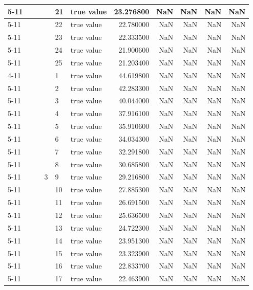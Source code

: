 \begin{tabular}{llllllrrrrr}
\cline{5-11}
 &  &  &  & 21 & true value & 23.276800 & NaN & NaN & NaN & NaN \\
\cline{5-11}
 &  &  &  & 22 & true value & 22.780000 & NaN & NaN & NaN & NaN \\
\cline{5-11}
 &  &  &  & 23 & true value & 22.333500 & NaN & NaN & NaN & NaN \\
\cline{5-11}
 &  &  &  & 24 & true value & 21.900600 & NaN & NaN & NaN & NaN \\
\cline{5-11}
 &  &  &  & 25 & true value & 21.203400 & NaN & NaN & NaN & NaN \\
\cline{4-11} \cline{5-11}
 &  &  & \multirow[t]{25}{*}{3} & 1 & true value & 44.619800 & NaN & NaN & NaN & NaN \\
\cline{5-11}
 &  &  &  & 2 & true value & 42.283300 & NaN & NaN & NaN & NaN \\
\cline{5-11}
 &  &  &  & 3 & true value & 40.044000 & NaN & NaN & NaN & NaN \\
\cline{5-11}
 &  &  &  & 4 & true value & 37.916100 & NaN & NaN & NaN & NaN \\
\cline{5-11}
 &  &  &  & 5 & true value & 35.910600 & NaN & NaN & NaN & NaN \\
\cline{5-11}
 &  &  &  & 6 & true value & 34.034300 & NaN & NaN & NaN & NaN \\
\cline{5-11}
 &  &  &  & 7 & true value & 32.291800 & NaN & NaN & NaN & NaN \\
\cline{5-11}
 &  &  &  & 8 & true value & 30.685800 & NaN & NaN & NaN & NaN \\
\cline{5-11}
 &  &  &  & 9 & true value & 29.216800 & NaN & NaN & NaN & NaN \\
\cline{5-11}
 &  &  &  & 10 & true value & 27.885300 & NaN & NaN & NaN & NaN \\
\cline{5-11}
 &  &  &  & 11 & true value & 26.691500 & NaN & NaN & NaN & NaN \\
\cline{5-11}
 &  &  &  & 12 & true value & 25.636500 & NaN & NaN & NaN & NaN \\
\cline{5-11}
 &  &  &  & 13 & true value & 24.722300 & NaN & NaN & NaN & NaN \\
\cline{5-11}
 &  &  &  & 14 & true value & 23.951300 & NaN & NaN & NaN & NaN \\
\cline{5-11}
 &  &  &  & 15 & true value & 23.323900 & NaN & NaN & NaN & NaN \\
\cline{5-11}
 &  &  &  & 16 & true value & 22.833700 & NaN & NaN & NaN & NaN \\
\cline{5-11}
 &  &  &  & 17 & true value & 22.463900 & NaN & NaN & NaN & NaN \\

\end{tabular}
